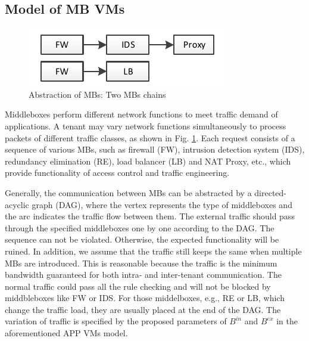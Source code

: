 \documentclass[review]{elsarticle}
\begin{document}



\subsection{Model of MB VMs}\label{sec:modelformb}

\begin{figure}
	\centering
	\includegraphics[width=3.5 in]{fig/chain.pdf}
	\caption{Abstraction of MBs: Two MBs chains}
	\label{fig:chain}
\end{figure}

Middleboxes perform different network functions to meet traffic demand of applications. A tenant may vary network functions simultaneously to process packets of different traffic classes, as shown in Fig. \ref{fig:chain}. Each request consists of a sequence of various MBs, such as firewall (FW), intrusion detection system (IDS), redundancy elimination (RE), load balancer (LB) and NAT Proxy, etc., which provide functionality of access control and traffic engineering. 


Generally, the communication between MBs can be abstracted by a directed-acyclic graph (DAG), where the vertex represents the type of middleboxes and the arc indicates the traffic flow between them. The external traffic should pass through the specified middleboxes one by one according to the DAG. The sequence can not be violated. Otherwise, the expected functionality will be ruined. In addition, we assume that the traffic still keeps the same when multiple MBs are introduced. This is reasonable because the traffic is the minimum bandwidth guaranteed for both intra- and inter-tenant communication. The normal traffic could pass all the rule checking and will not be blocked by middbleboxes like FW or IDS. For those middelboxes, e.g., RE or LB, which change the traffic load, they are usually placed at the end of the DAG. The variation of traffic is specified by the proposed parameters of $B^{in}$ and $B^{ex}$ in the aforementioned APP VMs model.
\end{document}

